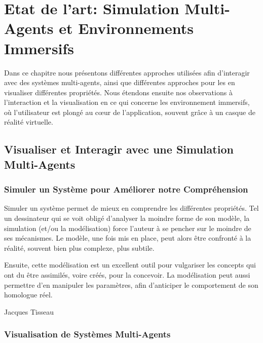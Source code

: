 \chapter{Etat de l'art: Simulation Multi-Agents et Environnements Immersifs}

	Dans ce chapitre nous présentons différentes approches utilisées afin d'interagir avec des systèmes multi-agents, ainsi que différentes approches pour les en visualiser différentes propriétés. Nous étendons ensuite nos observations à l'interaction et la visualisation en ce qui concerne les environnement immersifs, où l'utilisateur est plongé au cœur de l'application, souvent grâce à un casque de réalité virtuelle.

	\section{Visualiser et Interagir avec une Simulation Multi-Agents}
		\subsection{Simuler un Système pour Améliorer notre Compréhension}
		
		Simuler un système permet de mieux en comprendre les différentes propriétés. Tel un dessinateur qui se voit obligé d'analyser la moindre forme de son modèle, la simulation (et/ou la modélisation) force l'auteur à se pencher sur le moindre de ses mécanismes. Le modèle, une fois mis en place, peut alors être confronté à la réalité, souvent bien plus complexe, plus subtile.
		
		Ensuite, cette modélisation est un excellent outil pour vulgariser les concepts qui ont du être assimilés, voire créés, pour la concevoir. La modélisation peut aussi permettre d'en manipuler les paramètres, afin d'anticiper le comportement de son homologue réel.
		
		Jacques Tisseau
		\subsection{Visualisation de Systèmes Multi-Agents}
		
